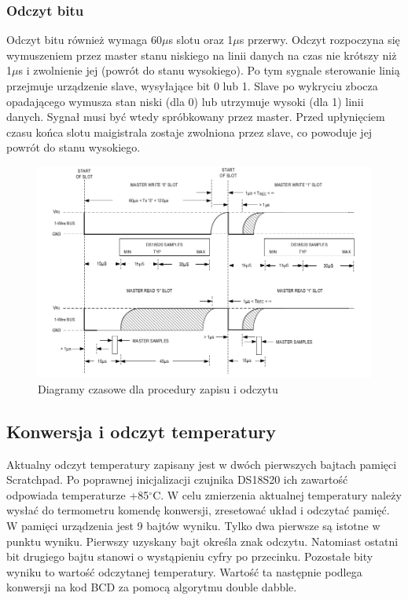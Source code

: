 \documentclass[a4paper]{article}
\begin{document}
\subsubsection{Odczyt bitu}
Odczyt bitu również wymaga 60$\mu$s slotu oraz 1$\mu$s przerwy. Odczyt rozpoczyna się wymuszeniem przez master stanu niskiego na linii danych na czas nie krótszy niż 1$\mu$s i zwolnienie jej (powrót do stanu wysokiego). Po tym sygnale sterowanie linią przejmuje urządzenie slave, wysyłające bit 0 lub 1. Slave po wykryciu zbocza opadającego wymusza stan niski (dla 0) lub utrzymuje  wysoki (dla 1) linii danych. Sygnał musi być wtedy spróbkowany przez master. Przed upłynięciem czasu końca slotu maigistrala zostaje zwolniona przez slave, co powoduje jej powrót do stanu wysokiego.

\begin{figure}[!h]
\begin{center}
\includegraphics[width=14cm]{graphics/slots.png}
\end{center}
\caption{Diagramy czasowe dla procedury zapisu i odczytu}
\label{slotsitming}
\end{figure}

\subsection{Konwersja i odczyt temperatury}
Aktualny odczyt temperatury zapisany jest w dwóch pierwszych bajtach pamięci Scratchpad. Po poprawnej inicjalizacji czujnika DS18S20 ich zawartość odpowiada temperaturze +85$^\circ$C. W celu zmierzenia aktualnej temperatury należy wysłać do termometru komendę konwersji, zresetować układ i odczytać pamięć. W pamięci urządzenia jest 9 bajtów wyniku. Tylko dwa pierwsze są istotne w punktu wyniku. Pierwszy uzyskany bajt określa znak odczytu. Natomiast ostatni bit drugiego bajtu stanowi o wystąpieniu cyfry po przecinku. Pozostałe bity wyniku to wartość odczytanej temperatury.  Wartość ta następnie podlega konwersji na kod BCD za pomocą  algorytmu double dabble.
\end{document}
